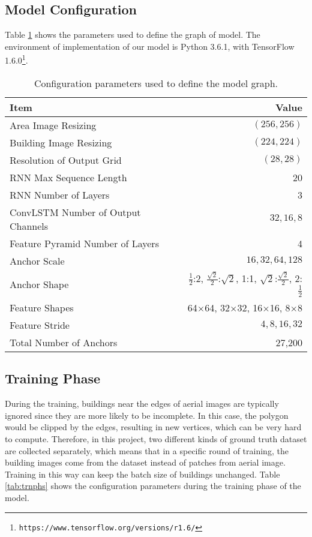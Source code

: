\subsection{Model Configuration}\label{config}
Table \ref{tab:configpara} shows the parameters used to define the graph of model. The environment of implementation of our model is Python 3.6.1, with TensorFlow 1.6.0\setcounter{footnote}{0}\footnote{\lstinline{https://www.tensorflow.org/versions/r1.6/}}.
\begin{table}[!h]
	\centering
	\caption[Configuration parameters used to define the model graph]{Configuration  parameters used to define the model graph.}
	\label{tab:configpara}
	\begin{tabular}{l|r}
	\hline
	\textbf{Item} & \textbf{Value} \\
	\hline
	Area Image Resizing & $(256, 256)$ \\
	Building Image Resizing & $(224, 224)$ \\
	Resolution of Output Grid & $(28, 28)$ \\
	\hline
	RNN Max Sequence Length & 20 \\
	RNN Number of Layers & 3 \\
	ConvLSTM Number of Output Channels & $32, 16, 8$ \\
	\hline
	Feature Pyramid Number of Layers & 4 \\
	Anchor Scale & $16, 32, 64, 128$ \\
	Anchor Shape & $\frac{1}{2}$:2, $\frac{\sqrt{2}}{2}$:$\sqrt{2}$, 1:1, $\sqrt{2}$:$\frac{\sqrt{2}}{2}$, 2:$\frac{1}{2}$ \\
	Feature Shapes & 64$\times$64, 32$\times$32, 16$\times$16, 8$\times$8 \\
	Feature Stride & $4, 8, 16, 32$ \\
	Total Number of Anchors & 27,200 \\
	\hline
	\end{tabular}
\end{table}

\subsection{Training Phase}\label{trnphs}
During the training, buildings near the edges of aerial images are typically ignored since they are more likely to be incomplete. In this case, the polygon would be clipped by the edges, resulting in new vertices, which can be very hard to compute. Therefore, in this project, two different kinds of ground truth dataset are collected separately, which means that in a specific round of training, the building images come from the dataset instead of patches from aerial image. Training in this way can keep the batch size of buildings unchanged. Table \ref{tab:trnphs} shows the configuration parameters during the training phase of the model.

